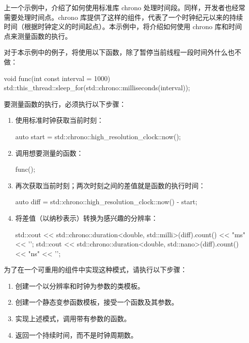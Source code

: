 上一个示例中，介绍了如何使用标准库 chrono 处理时间段。同样，开发者也经常需要处理时间点。chrono 库提供了这样的组件，代表了一个时钟纪元以来的持续时间（根据时钟定义的时间起点）。本示例中，将介绍如何使用 chrono 库和时间点来测量函数的执行。


对于本示例中的例子，将使用以下函数，除了暂停当前线程一段时间外什么也不做：

\begin{cpp}
void func(int const interval = 1000)
{
    std::this_thread::sleep_for(std::chrono::milliseconds(interval));
}
\end{cpp}


要测量函数的执行，必须执行以下步骤：

\begin{enumerate}
\item
使用标准时钟获取当前时刻：

\begin{cpp}
auto start = std::chrono::high_resolution_clock::now();
\end{cpp}

\item
调用想要测量的函数：

\begin{cpp}
func();
\end{cpp}

\item
再次获取当前时刻；两次时刻之间的差值就是函数的执行时间：

\begin{cpp}
auto diff = std::chrono::high_resolution_clock::now() - start;
\end{cpp}

\item
将差值（以纳秒表示）转换为感兴趣的分辨率：

\begin{cpp}
std::cout
    << std::chrono::duration<double, std::milli>(diff).count()
    << "ms" << '\n';
std::cout
    << std::chrono::duration<double, std::nano>(diff).count()
    << "ns" << '\n';
\end{cpp}


\end{enumerate}

为了在一个可重用的组件中实现这种模式，请执行以下步骤：

\begin{enumerate}
\item
创建一个以分辨率和时钟为参数的类模板。

\item
创建一个静态变参函数模板，接受一个函数及其参数。

\item
实现上述模式，调用带有参数的函数。

\item
返回一个持续时间，而不是时钟周期数。
\end{enumerate}


